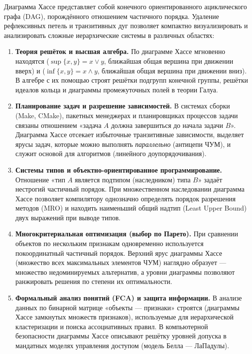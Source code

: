 \begin{remark}
    Диаграмма Хассе представляет собой  
    конечного ориентированного ациклического графа (DAG), порождённого 
    отношением частичного порядка. Удаление рефлексивных петель и 
    транзитивных дуг позволяет компактно визуализировать и анализировать 
    сложные иерархические системы в различных областях:
    \begin{enumerate}
        \item \textbf{Теория решёток и высшая алгебра.} 
        По диаграмме Хассе мгновенно находятся  
        ($\sup\{x, y\} = x \lor y$, ближайшая общая вершина при движении 
        вверх) и  ($\inf\{x, y\} = x \land y$, 
        ближайшая общая вершина при движении вниз). В алгебре с их помощью 
        строят решётки подгрупп конечной группы, решётки идеалов кольца и 
        диаграммы промежуточных полей в теории Галуа.
        \item \textbf{Планирование задач и разрешение зависимостей.} 
        В системах сборки (Make, CMake), пакетных менеджерах и планировщиках 
        процессов задачи связаны отношением «задача $A$ должна завершиться до 
        начала задачи $B$». Диаграмма Хассе отсекает избыточные транзитивные 
        зависимости, выделяет ярусы задач, которые можно выполнять 
        \emph{параллельно} (антицепи ЧУМ), и служит основой для алгоритмов 
         (линейного доупорядочивания).
        \item \textbf{Системы типов и объектно-ориентированное 
        программирование.} 
        Отношение «тип $A$ является подтипом (наследником) типа $B$» задаёт 
        нестрогий частичный порядок. При множественном 
        наследовании диаграмма Хассе позволяет компилятору однозначно 
        определять порядок разрешения методов (MRO) и находить наименьший 
        общий надтип (Least Upper Bound) двух выражений при выводе типов.
        \item \textbf{Многокритериальная оптимизация (выбор по Парето).} 
        При сравнении объектов по нескольким признакам одновременно 
        используется покоординатный частичный порядок. Верхний 
        ярус диаграммы Хассе (множество всех максимальных элементов ЧУМ) 
        наглядно образует  --- множество 
        недоминируемых альтернатив, а уровни диаграммы позволяют ранжировать 
        решения по степени их оптимальности.
        \item \textbf{Формальный анализ понятий (FCA) и защита информации.} 
        В анализе данных по бинарной матрице «объекты --- признаки» 
        строятся  (диаграммы Хассе замкнутых 
        множеств признаков), используемые для иерархической кластеризации и 
        поиска ассоциативных правил. В компьютерной безопасности диаграммы 
        Хассе описывают решётку уровней допуска в мандатных моделях 
        управления доступом (модель Белла --- ЛаПадулы).
    \end{enumerate}
\end{remark}
